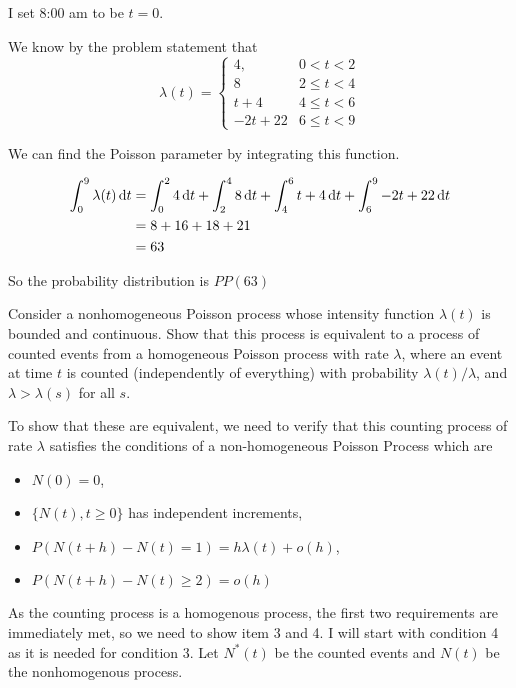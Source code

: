 \documentclass[10pt,a4paper]{exam}
\begin{document}
\begin{questions}
\begin{solution}
I set 8:00 am to be $t = 0$.

We know by the problem statement that
$$\lambda(t) = \begin{cases}
4,					& 0 < t < 2\\
8					& 2 \leq t < 4\\
t + 4				& 4 \leq t < 6\\
-2t + 22		& 6 \leq t < 9
\end{cases}$$

We can find the Poisson parameter by integrating this function.

\begin{align*}
\int_0^9 \lambda(t) \dif t		&= \int_0^2 4 \dif t + \int_2^4 8 \dif t + \int_4^6 t + 4 \dif t + \int_6^9 -2t + 22 \dif t\\
											&= 8 + 16 + 18 + 21\\
											&= 63
\end{align*}

So the probability distribution is $PP(63)$
\end{solution}
\pagebreak
\question Consider a nonhomogeneous Poisson process whose intensity function $\lambda(t)$ is bounded and continuous. Show that this process is equivalent to a process of counted events from a homogeneous Poisson process with rate $\lambda$, where an event at time $t$ is counted (independently of everything) with probability $\lambda(t)/\lambda$, and $\lambda > \lambda(s)$ for all $s$. 

\begin{solution}
To show that these are equivalent, we need to verify that this counting process of rate $\lambda$ satisfies the conditions of a non-homogeneous Poisson Process which are
\begin{itemize}
\item $N(0) = 0$,
\item $\{N(t), t \geq 0\}$ has independent increments,
\item $P(N(t+h) - N(t) = 1) = h\lambda(t) + o(h)$,
\item $P(N(t+h) - N(t) \geq 2) = o(h)$
\end{itemize}

As the counting process is a homogenous process, the first two requirements are immediately met, so we need to show item 3 and 4. I will start with condition 4 as it is needed for condition 3. Let $N^*(t)$ be the counted events and $N(t)$ be the nonhomogenous process.


\end{solution}
\end{questions}
\end{document}
